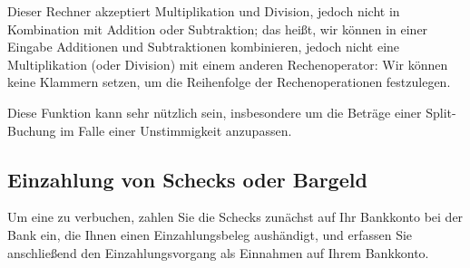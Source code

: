 Dieser Rechner akzeptiert Multiplikation und Division, jedoch nicht in Kombination mit Addition oder Subtraktion; das heißt, wir können in einer Eingabe Additionen und Subtraktionen kombinieren, jedoch nicht eine Multiplikation (oder Division) mit einem anderen Rechenoperator: Wir können keine Klammern setzen, um die Reihenfolge der Rechenoperationen festzulegen.

Diese Funktion kann sehr nützlich sein, insbesondere um die Beträge einer Split-Buchung im Falle einer Unstimmigkeit anzupassen.


\subsection{Einzahlung von Schecks oder Bargeld\label{transactions-new-cheque}}

Um eine  zu verbuchen, zahlen Sie die Schecks zunächst auf Ihr Bankkonto bei der Bank ein, die Ihnen einen Einzahlungsbeleg aushändigt, und erfassen Sie anschließend den Einzahlungsvorgang als Einnahmen auf Ihrem Bankkonto.

